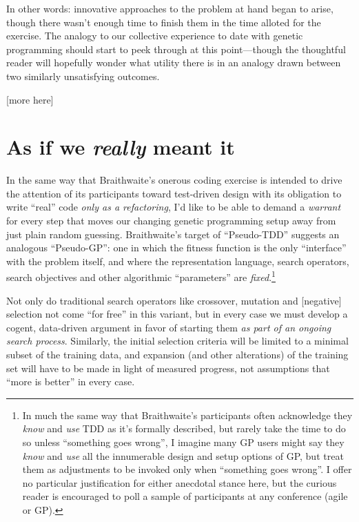 In other words: innovative approaches to the problem at hand began to arise, though there wasn't enough time to finish them in the time alloted for the exercise. The analogy to our collective experience to date with genetic programming should start to peek through at this point---though the thoughtful reader will hopefully wonder what utility there is in an analogy drawn between two similarly unsatisfying outcomes.

[more here]

\section{As if we \emph{really} meant it}\hypertarget{as-if-we-really-meant-it}{}\label{as-if-we-really-meant-it}

In the same way that Braithwaite's onerous coding exercise is intended to drive the attention of its participants toward test-driven design with its obligation to write ``real'' code \emph{only as a refactoring}, I'd like to be able to demand a \emph{warrant} for every step that moves our changing genetic programming setup away from just plain random guessing. Braithwaite's target of ``Pseudo-TDD'' suggests an analogous ``Pseudo-GP'': one in which the fitness function is the only ``interface'' with the problem itself, and where the representation language, search operators, search objectives and other algorithmic ``parameters'' are \emph{fixed}.\footnote{In much the same way that Braithwaite's participants often acknowledge they \emph{know} and \emph{use} TDD as it's formally described, but rarely take the time to do so unless ``something goes wrong'', I imagine many GP users might say they \emph{know} and \emph{use} all the innumerable design and setup options of GP, but treat them as adjustments to be invoked only when ``something goes wrong''. I offer no particular justification for either anecdotal stance here, but the curious reader is encouraged to poll a sample of participants at any conference (agile or GP).}

Not only do traditional search operators like crossover, mutation and [negative] selection not come ``for free'' in this variant, but in every case we must develop a cogent, data-driven argument in favor of starting them \emph{as part of an ongoing search process}. Similarly, the initial selection criteria will be limited to a minimal subset of the training data, and expansion (and other alterations) of the training set will have to be made in light of measured progress, not assumptions that ``more is better'' in every case.

